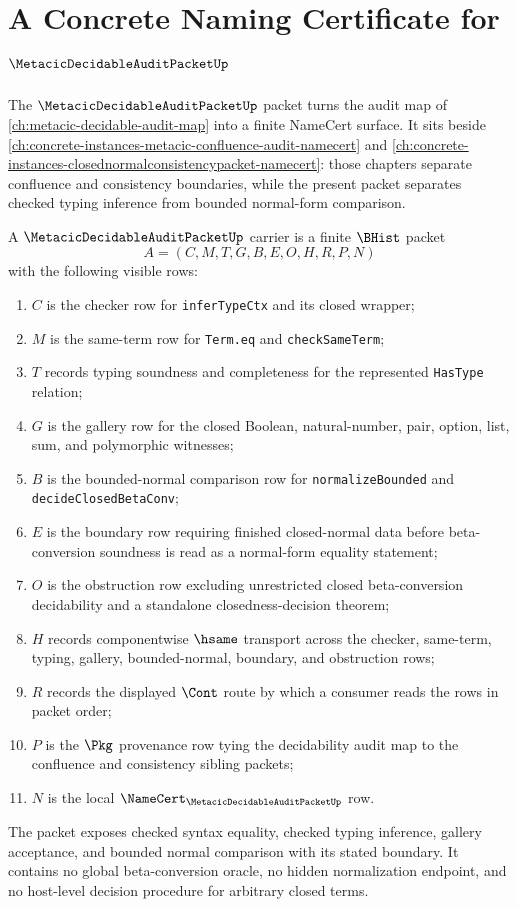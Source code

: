 \chapter{A Concrete Naming Certificate for $\MetacicDecidableAuditPacketUp$}
\label{ch:concrete-instances-metacicdecidableauditpacket-namecert}

The $\MetacicDecidableAuditPacketUp$ packet turns the audit map of \autoref{ch:metacic-decidable-audit-map} into a finite NameCert surface. It sits beside \autoref{ch:concrete-instances-metacic-confluence-audit-namecert} and \autoref{ch:concrete-instances-closednormalconsistencypacket-namecert}: those chapters separate confluence and consistency boundaries, while the present packet separates checked typing inference from bounded normal-form comparison.

\begin{definition}
\label{def:metacic-decidable-audit-packet}
A $\MetacicDecidableAuditPacketUp$ carrier is a finite $\BHist$ packet
$$
A=(C,M,T,G,B,E,O,H,R,P,N)
$$
with the following visible rows:
\begin{enumerate}
\item $C$ is the checker row for \texttt{inferTypeCtx} and its closed wrapper;
\item $M$ is the same-term row for \texttt{Term.eq} and \texttt{checkSameTerm};
\item $T$ records typing soundness and completeness for the represented \texttt{HasType} relation;
\item $G$ is the gallery row for the closed Boolean, natural-number, pair, option, list, sum, and polymorphic witnesses;
\item $B$ is the bounded-normal comparison row for \texttt{normalizeBounded} and \texttt{decideClosedBetaConv};
\item $E$ is the boundary row requiring finished closed-normal data before beta-conversion soundness is read as a normal-form equality statement;
\item $O$ is the obstruction row excluding unrestricted closed beta-conversion decidability and a standalone closedness-decision theorem;
\item $H$ records componentwise $\hsame$ transport across the checker, same-term, typing, gallery, bounded-normal, boundary, and obstruction rows;
\item $R$ records the displayed $\Cont$ route by which a consumer reads the rows in packet order;
\item $P$ is the $\Pkg$ provenance row tying the decidability audit map to the confluence and consistency sibling packets;
\item $N$ is the local $\NameCert_{\MetacicDecidableAuditPacketUp}$ row.
\end{enumerate}
The packet exposes checked syntax equality, checked typing inference, gallery acceptance, and bounded normal comparison with its stated boundary. It contains no global beta-conversion oracle, no hidden normalization endpoint, and no host-level decision procedure for arbitrary closed terms.
\end{definition}
